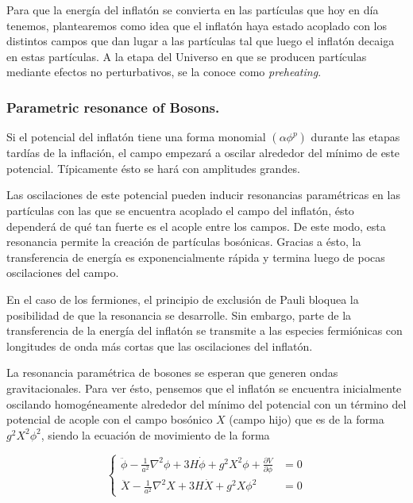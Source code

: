 Para que la energía del inflatón se convierta en las partículas que hoy en día tenemos, plantearemos como idea que el inflatón haya estado acoplado con los distintos campos que dan lugar a las partículas tal que luego el inflatón decaiga en estas partículas. A la etapa del Universo en que se producen partículas mediante efectos no perturbativos, se la conoce como \textit{preheating}.

\subsubsection{Parametric resonance of Bosons.}

Si el potencial del inflatón tiene una forma monomial $(\displaystyle \alpha \phi^p)$ durante las etapas tardías de la inflación, el campo empezará a oscilar alrededor del mínimo de este potencial. Típicamente ésto se hará con amplitudes grandes.

Las oscilaciones de este potencial pueden inducir resonancias paramétricas en las partículas con las que se encuentra acoplado el campo del inflatón, ésto dependerá de qué tan fuerte es el acople entre los campos. De este modo, esta resonancia permite la creación de partículas bosónicas. Gracias a ésto, la transferencia de energía es exponencialmente rápida y termina luego de pocas oscilaciones del campo.

En el caso de los fermiones, el principio de exclusión de Pauli bloquea la posibilidad de que la resonancia se desarrolle. Sin embargo, parte de la transferencia de la energía del inflatón se transmite a las especies fermiónicas con longitudes de onda más cortas que las oscilaciones del inflatón.

La resonancia paramétrica de bosones se esperan que generen ondas gravitacionales. Para ver ésto, pensemos que el inflatón se encuentra inicialmente oscilando homogéneamente alrededor del mínimo del potencial con un término del potencial de acople con el campo bosónico $X$ (campo hijo) que es de la forma $g^2 X^2 \phi^2$, siendo la ecuación de movimiento de la forma

\begin{equation}
    \begin{cases}
        \displaystyle \ddot{\phi} - \frac{1}{a^2} \nabla^2 \phi + 3 H \dot{\phi} + g^2 X^2 \phi + \frac{\partial V}{\partial \phi} &= 0\\
        \displaystyle \ddot{X} - \frac{1}{a^2} \nabla^2 X + 3 H \dot{X} + g^2 X \phi^2 &= 0
    \end{cases}
\end{equation}

